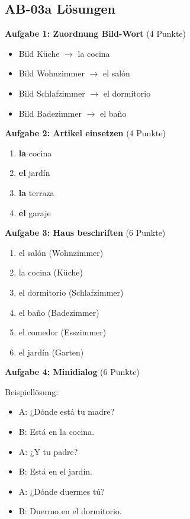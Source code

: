 \documentclass[11pt,a4paper]{article}
\begin{document}
\subsection{AB-03a Lösungen}

\textbf{Aufgabe 1: Zuordnung Bild-Wort} (4 Punkte)
\begin{itemize}
    \item Bild Küche $\rightarrow$ la cocina
    \item Bild Wohnzimmer $\rightarrow$ el salón
    \item Bild Schlafzimmer $\rightarrow$ el dormitorio
    \item Bild Badezimmer $\rightarrow$ el baño
\end{itemize}

\textbf{Aufgabe 2: Artikel einsetzen} (4 Punkte)
\begin{enumerate}[label=\alph*)]
    \item \textbf{la} cocina
    \item \textbf{el} jardín
    \item \textbf{la} terraza
    \item \textbf{el} garaje
\end{enumerate}

\textbf{Aufgabe 3: Haus beschriften} (6 Punkte)
\begin{enumerate}
    \item el salón (Wohnzimmer)
    \item la cocina (Küche)
    \item el dormitorio (Schlafzimmer)
    \item el baño (Badezimmer)
    \item el comedor (Esszimmer)
    \item el jardín (Garten)
\end{enumerate}

\textbf{Aufgabe 4: Minidialog} (6 Punkte)

Beispiellösung:
\begin{itemize}
    \item A: ¿Dónde está tu madre?
    \item B: Está en la cocina.
    \item A: ¿Y tu padre?
    \item B: Está en el jardín.
    \item A: ¿Dónde duermes tú?
    \item B: Duermo en el dormitorio.
\end{itemize}
\end{document}
